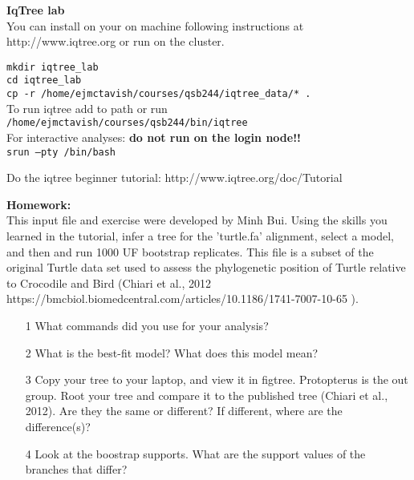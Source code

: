 \documentclass{beamer}
\begin{document}
\begin{frame}
\textbf{IqTree lab}\\
You can install on your on machine following instructions at http://www.iqtree.org
or run on the cluster.

\texttt{mkdir iqtree\_lab}\\
\texttt{cd iqtree\_lab}\\
\texttt{cp -r /home/ejmctavish/courses/qsb244/iqtree\_data/* .}\\
\medskip
To run iqtree add to path or run
\texttt{/home/ejmctavish/courses/qsb244/bin/iqtree}\\


\medskip
For interactive analyses: \textbf{do not run on the login node!!}\\
\texttt{srun --pty /bin/bash}

\medskip
Do the iqtree beginner tutorial: 
http://www.iqtree.org/doc/Tutorial


 
\end{frame}

\begin{frame}

\textbf{Homework:}\\
This input file and exercise were developed by Minh Bui.
Using the skills you learned in the tutorial, infer a tree for the 'turtle.fa' alignment, select a model, and then and run 1000 UF bootstrap replicates. 
This file is a subset of the original Turtle data set used to assess the phylogenetic position of Turtle relative to Crocodile and Bird (Chiari et al., 2012 https://bmcbiol.biomedcentral.com/articles/10.1186/1741-7007-10-65 ).
     \begin{itemize}
      \item[1] What commands did you use for your analysis?
      \item[2] What is the best-fit model? What does this model mean?
      \item[3] Copy your tree to your laptop, and view it in figtree. Protopterus is the out group. Root your tree and compare it to the published tree (Chiari et al., 2012). Are they the same or different? If different, where are the difference(s)?
      \item[4] Look at the boostrap supports. What are the support values of the branches that differ?
      
      
     \end{itemize}

        
\end{frame}
\end{document}

